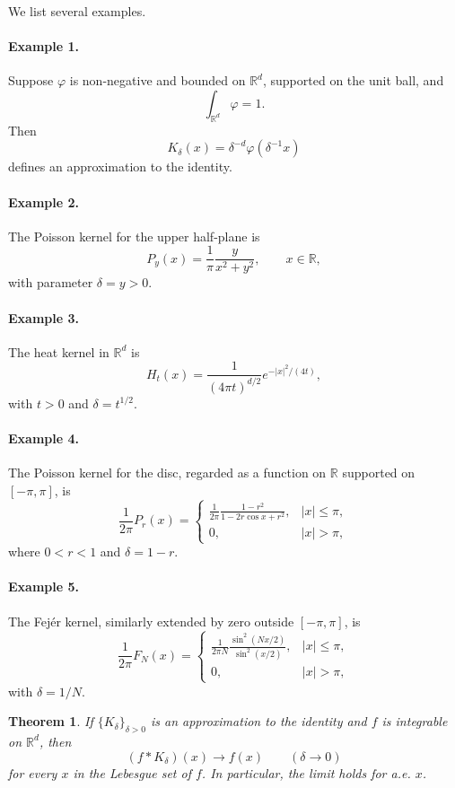 \documentclass[11pt,openany]{book}
\newtheorem{theorem}{Theorem}[section]
\begin{document}
We list several examples.

\paragraph{Example 1.}
Suppose $\varphi$ is non-negative and bounded on $\mathbb R^d$, supported on the unit ball, and
\[
\int_{\mathbb R^d}\varphi=1.
\]
Then
\[
K_\delta(x)=\delta^{-d}\varphi(\delta^{-1}x)
\]
defines an approximation to the identity.

\paragraph{Example 2.}
The Poisson kernel for the upper half-plane is
\[
P_y(x)=\frac1\pi\frac{y}{x^2+y^2},\qquad x\in\mathbb R,
\]
with parameter $\delta=y>0$.

\paragraph{Example 3.}
The heat kernel in $\mathbb R^d$ is
\[
H_t(x)=\frac1{(4\pi t)^{d/2}}e^{-|x|^2/(4t)},
\]
with $t>0$ and $\delta=t^{1/2}$.

\paragraph{Example 4.}
The Poisson kernel for the disc, regarded as a function on $\mathbb R$ supported on $[-\pi,\pi]$, is
\[
\frac1{2\pi}P_r(x)=
\begin{cases}
\displaystyle \frac1{2\pi}\frac{1-r^2}{1-2r\cos x+r^2},& |x|\le\pi,\\[6pt]
0,&|x|>\pi,
\end{cases}
\]
where $0<r<1$ and $\delta=1-r$.

\paragraph{Example 5.}
The Fej\'er kernel, similarly extended by zero outside $[-\pi,\pi]$, is
\[
\frac1{2\pi}F_N(x)=
\begin{cases}
\displaystyle \frac1{2\pi N}\frac{\sin^2(Nx/2)}{\sin^2(x/2)},&|x|\le\pi,\\[6pt]
0,&|x|>\pi,
\end{cases}
\]
with $\delta=1/N$.

\begin{theorem}
If $\{K_\delta\}_{\delta>0}$ is an approximation to the identity and $f$ is integrable on $\mathbb R^d$, then
\[
(f*K_\delta)(x)\longrightarrow f(x)\qquad(\delta\to0)
\]
for every $x$ in the Lebesgue set of $f$. In particular, the limit holds for a.e. $x$.
\end{theorem}
\end{document}
